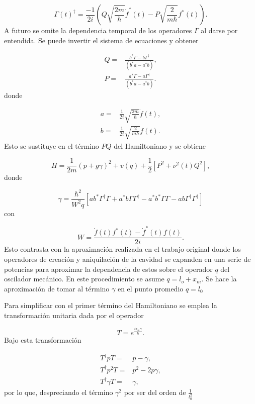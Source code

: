 \documentclass[10pt,a4paper]{report}
\begin{document}
\begin{equation}
\Gamma(t)^\dagger = \frac{-1}{2i}(Q\sqrt{\frac{2m}{\hbar}}\dot{f}^*(t)-P\sqrt{\frac{2}{m\hbar}}f^*(t)).
\end{equation} A futuro se omite la dependencia temporal de los operadores $\Gamma$ al darse por entendida. Se puede invertir el sistema de ecuaciones y obtener

\begin{align}
Q =& \frac{b^* \Gamma - b \Gamma^\dagger}{(b^* a - a^*b)},\\
P =& \frac{a^* \Gamma - a \Gamma^\dagger}{(b^* a - a^*b)}.
\end{align} donde

\begin{align}
a =& \frac{1}{2i}\sqrt{\frac{2m}{\hbar}} \dot{f}(t),\\
b =& \frac{1}{2i}\sqrt{\frac{2}{m\hbar}} f(t).
\end{align} Esto se sustituye en el término $PQ$ del Hamiltoniano y se obtiene

\begin{equation}
H = \frac{1}{2m}(p + g \gamma)^2 + v(q) + \frac{1}{2}[P^2+\nu^2 (t)Q^2],
\end{equation} donde

\begin{equation}
\gamma = \frac{\hbar^2}{W^2 q}[ab^*\Gamma^\dagger \Gamma + a^*b \Gamma \Gamma^\dagger - a^*b^* \Gamma \Gamma - ab \Gamma^\dagger \Gamma^\dagger]
\end{equation} con

\begin{equation}
W= \frac{\dot{f}(t)f^*(t)-\dot{f}^*(t)f(t)}{2i}.
\end{equation}
Esto contrasta con la aproximación realizada en el trabajo original \cite{LawOH}
donde los operadores de creación y aniquilación de la cavidad se
expanden en una serie de potencias para aproximar la dependencia de
estos sobre el operador $q$ del oscilador mecánico. En este
procedimiento se asume $q = l_o + x_m$.  Se hace la aproximación de tomar al término $\gamma$ en el punto promedio  $q=l_0$


Para simplificar con el primer término del Hamiltoniano se emplea la transformación unitaria dada por el operador

\begin{equation}
T = e^\frac{i x_m \gamma}{\hbar}.
\end{equation} Bajo esta transformación 

\begin{align*}
T^\dagger p T =& p - \gamma, \\
T^\dagger p^2 T =& p^2 -2p\gamma, \\
T^\dagger \gamma T =& \gamma,
\end{align*} por lo que, despreciando el término $\gamma^2$ por ser del orden de $\frac{1}{l_0^2}$
\end{document}
